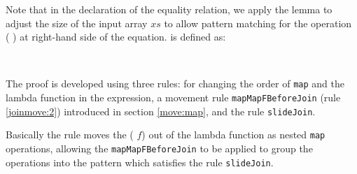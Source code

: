 \documentclass{l4proj}
\begin{document}
Note that in the declaration of the equality relation, we apply the lemma  to adjust the size of the input array $xs$ to allow pattern matching for the operation (\AgdaSpace{}%
\AgdaSymbol{\{}\AgdaSpace{}%
\AgdaOperator{\AgdaPrimitive{+}}\AgdaSpace{}%
\AgdaSpace{}%
\AgdaOperator{\AgdaPrimitive{*}}\AgdaSpace{}%
\AgdaSymbol{(}\AgdaSpace{}%
\AgdaSymbol{)\}}\AgdaSpace{}%
\AgdaSpace{}%
) at right-hand side of the equation.  is defined as:
\begin{code}%
\>[0]\AgdaSpace{}%
\AgdaSymbol{:}%
\>[114I]\AgdaSymbol{(}\AgdaSpace{}%
\AgdaSpace{}%
\AgdaSpace{}%
\AgdaSpace{}%
\AgdaSymbol{:}\AgdaSpace{}%
\AgdaSymbol{)}\AgdaSpace{}%
\<%
\\
\>[.][@{}l@{}]\<[114I]%
\>[17]\AgdaSpace{}%
\AgdaOperator{\AgdaPrimitive{+}}\AgdaSpace{}%
\AgdaSpace{}%
\AgdaOperator{\AgdaPrimitive{*}}\AgdaSpace{}%
\AgdaSpace{}%
\AgdaSpace{}%
\AgdaOperator{\AgdaPrimitive{+}}\AgdaSpace{}%
\AgdaSpace{}%
\AgdaOperator{\AgdaPrimitive{*}}\AgdaSpace{}%
\AgdaSpace{}%
\AgdaSymbol{(}\AgdaSpace{}%
\AgdaOperator{\AgdaPrimitive{+}}\AgdaSpace{}%
\AgdaSpace{}%
\AgdaOperator{\AgdaPrimitive{+}}\AgdaSpace{}%
\AgdaSpace{}%
\AgdaOperator{\AgdaPrimitive{*}}\AgdaSpace{}%
\AgdaSymbol{)}\AgdaSpace{}%
\AgdaSpace{}\AgdaSpace{}%
\AgdaOperator{\AgdaPrimitive{+}}\AgdaSpace{}%
\AgdaSymbol{(}\AgdaSpace{}%
\AgdaOperator{\AgdaPrimitive{+}}\AgdaSpace{}%
\AgdaSpace{}%
\AgdaOperator{\AgdaPrimitive{*}}\AgdaSpace{}%
\AgdaSpace{}%
\AgdaSymbol{)}\AgdaSpace{}%
\AgdaOperator{\AgdaPrimitive{*}}\AgdaSpace{}%
\AgdaSpace{}%
\<%
\end{code}
The proof is developed using three rules:  for changing the order of \texttt{map} and the lambda function in the expression, a movement rule \texttt{mapMapFBeforeJoin} (rule \ref{joinmove:2}) introduced in section \ref{move:map}, and the rule \texttt{slideJoin}.

 Basically the  rule moves the ( $f$) out of the lambda function as nested \texttt{map} operations, allowing the \texttt{mapMapFBeforeJoin} to be applied to group the operations into the pattern which satisfies the rule \texttt{slideJoin}.
 
\end{document}
